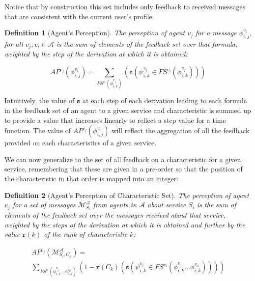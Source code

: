 \documentclass[compsoc, conference, letterpaper, 10pt, times]{IEEEtran}
\newtheorem{definition}{Definition}
\begin{document}
Notice that by construction this set includes only feedback to received messages that are consistent with the current user's profile. 

\begin{definition}[Agent's Perception]
The perception of agent $v_{j}$ for a message $\phi^{v_{i}}_{i,j}$, for all $v_{j}, v_{i} \in \mathcal{A}$ is the sum of elements of the feedback set over that formula, weighted by the step of the derivation at which it is obtained: 

\[
AP^{v_{j}}(\phi^{v_{i}}_{i,j})=\sum_{FS^{v_{i}}(\phi^{v_{j}}_{i,k})}(\mathtt{s}(\psi^{v_{j}}_{i,k} \in FS^{v_{i}}(\phi^{v_{j}}_{i,k})))
\]

\end{definition}

Intuitively, the value of $\mathtt{s}$ at each step of each derivation leading to each formula in the feedback set of an agent to a given service and characteristic is summed up to provide a value that increases linearly to reflect a step value for a time function. The value of $AP^{v_{j}}(\phi^{v_{i}}_{i,j})$ will reflect the aggregation of all the feedback provided on each characteristics of a given service.  


We can now generalize to the set of all feedback on a characteristic for a given service, remembering that these are given in a pre-order so that the position of the characteristic in that order is mapped into an integer:


\begin{definition}[Agent's Perception of Characteristic Set]
The perception of agent $v_{j}$ for a set of messages $\mathcal{M}^{\mathcal{A}}_{S_{i}}$ from agents in $\mathcal{A}$ about service $S_{i}$ 
is the sum of elements of the feedback set over the messages received about that service, weighted by the steps of the derivation at which it is obtained and further by the value $\mathtt{r}(k)$ of the rank of characteristic $k$: 


\begin{displaymath}
\begin{array}{l}

AP^{v_{j}}(\mathcal{M}^{\mathcal{A}}_{S_{i}, C_{k}})=\\
\sum_{FS^{v_{i}}(\phi^{v_{j}}_{i,k}\dots \phi^{v_{n}}_{i,k})}
(1-\mathtt{r}(C_{k})(\mathtt{s}(\psi^{v_{j}}_{i,k} \in FS^{v_{i}}(\phi^{v_{j}}_{i,k}\dots \phi^{v_{n}}_{i,k}))))
\end{array}
\end{displaymath}

\end{definition}
\end{document}
